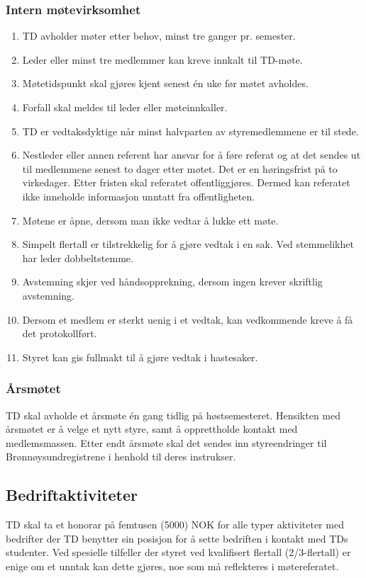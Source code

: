 \documentclass[11pt]{article}
\begin{document}
\subsubsection{Intern møtevirksomhet}
\begin{enumerate}
	\item TD avholder møter etter behov, minst tre ganger pr. semester.
	\item Leder eller minst tre medlemmer kan kreve innkalt til TD-møte.
	\item Møtetidspunkt skal gjøres kjent senest én uke før møtet avholdes.
	\item Forfall skal meldes til leder eller møteinnkaller.
	\item TD er vedtaksdyktige når minst halvparten av styremedlemmene er til stede.
	\item Nestleder eller annen referent har ansvar for å føre referat og at det sendes ut til medlemmene senest to dager etter møtet. Det er en høringsfrist på to virkedager. Etter fristen skal referatet offentliggjøres. Dermed kan referatet ikke inneholde informasjon unntatt fra offentligheten.
	\item Møtene er åpne, dersom man ikke vedtar å lukke ett møte.
	\item Simpelt flertall er tilstrekkelig for å gjøre vedtak i en sak. Ved stemmelikhet har leder dobbeltstemme.
	\item Avstemning skjer ved håndsopprekning, dersom ingen krever skriftlig avstemning.
	\item Dersom et medlem er sterkt uenig i et vedtak, kan vedkommende kreve å få det protokollført.
	\item Styret kan gis fullmakt til å gjøre vedtak i hastesaker.
\end{enumerate}

\subsubsection{Årsmøtet}
TD skal avholde et årsmøte én gang tidlig på høstsemesteret. Hensikten med årsmøtet er å velge et nytt styre, samt å opprettholde kontakt med medlemsmassen. Etter endt årsmøte skal det sendes inn styreendringer til Brønnøysundregistrene i henhold til deres instrukser.

\subsection{Bedriftaktiviteter}
TD skal ta et honorar på femtusen (5000) NOK for alle typer aktiviteter med bedrifter der TD benytter sin posisjon for å sette bedriften i kontakt med TDs studenter.
Ved spesielle tilfeller der styret ved kvalifisert flertall (2/3-flertall) er enige om et unntak kan dette gjøres, noe som må reflekteres i møtereferatet.
\end{document}
